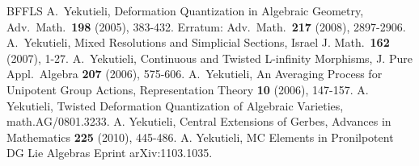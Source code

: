 \documentclass{conm-p-l}
\theoremstyle{definition}
\numberwithin{equation}{section}
\begin{document}
\begin{thebibliography}{BFFLS}
 A.\ Yekutieli, 
    Deformation Quantization in Algebraic Geometry,
    Adv.\ Math.\ {\bf 198} (2005), 383-432.
    Erratum: Adv.\ Math.\ {\bf 217} (2008), 2897-2906.
 A.\ Yekutieli,
    Mixed Resolutions and Simplicial Sections,
    Israel J. Math.\ {\bf 162} (2007), 1-27.
 A.\ Yekutieli,
    Continuous and Twisted L-infinity Morphisms,
    J. Pure Appl.\ Algebra {\bf 207} (2006), 575-606.
 A.\ Yekutieli,
    An Averaging Process for Unipotent Group Actions,
    Representation Theory {\bf 10} (2006), 147-157.
 A. Yekutieli,
  Twisted Deformation Quantization of Algebraic Varieties,
  math.AG/0801.3233.
 A. Yekutieli,
  Central Extensions of Gerbes,
  Advances in Mathematics {\bf 225} (2010), 445-486.
 A. Yekutieli,
  MC Elements in Pronilpotent DG Lie Algebras
  Eprint arXiv:1103.1035.
\end{thebibliography}
\end{document}
